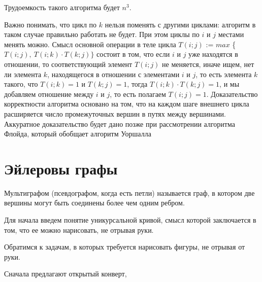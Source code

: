 \documentclass[russian]{lecture-notes}
\begin{document}
\begin{note}
    Трудоемкость такого алгоритма будет $n^3$.
    
    Важно понимать, что цикл по $k$ нельзя поменять с другими циклами: алгоритм в таком случае правильно работать не будет. При этом циклы по $i$ и $j$ местами менять можно. Смысл основной операции в теле цикла
    $T(i;j)$ := $max$ \{$T(i;j) , \ T(i;k) \cdot T(k;j)\}$ состоит в том, что если $i$ и $j$ уже находятся в отношении, то соответствующий элемент $T(i;j)$ не меняется, иначе ищем, нет ли элемента $k$, находящегося в отношении с элементами $i$ и $j$, то есть элемента $k$ такого, что $T(i; k)=1$ и $T(k; j)=1$, тогда  $T(i; k) \cdot T(k; j) = 1$, и мы добавляем отношение между $i$ и $j$, то есть полагаем $T(i;j)=1$. Доказательство корректности алгоритма основано на том, что на каждом шаге внешнего цикла расширяется число промежуточных вершин в путях между вершинами. Аккуратное доказательство будет дано позже при рассмотрении алгоритма Флойда, который обобщает алгоритм Уоршалла
\end{note}
         
\newpage


\section{Эйлеровы графы}

\begin{definition}
    Мультиграфом (псевдографом, когда есть петли) называется граф, в котором две вершины могут быть соединены более чем одним ребром.
\end{definition}

Для начала введем понятие уникурсальной кривой, смысл которой заключается в том, что ее можно нарисовать, не отрывая руки.

Обратимся к задачам, в которых требуется нарисовать фигуры, не отрывая от руки. 

Сначала предлагают открытый конверт,
\end{document}
